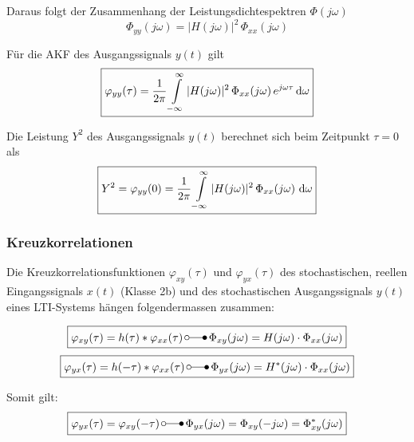 Daraus folgt der Zusammenhang der Leistungsdichtespektren $\Phi(j \omega)$
$$ \boxed{ \Phi_{yy}(j \omega) = |H(j \omega)|^2 \, \Phi_{xx}(j \omega) } $$

Für die AKF des Ausgangssignals $y(t)$ gilt 
$$ \boxed{ \varphi_{yy}(\tau) = \frac{1}{2 \pi} \int\limits_{- \infty}^{\infty} |H(j \omega)|^2 \, \Phi_{xx}(j \omega) \, e^{j \omega \tau} \mathop{} \! \mathrm{d} \omega } $$

Die Leistung $Y^2$ des Ausgangssignals $y(t)$ berechnet sich beim Zeitpunkt $\tau = 0$ als
$$ \boxed{ Y^2 = \varphi_{yy}(0) = \frac{1}{2 \pi} \int\limits_{- \infty}^{\infty} |H(j \omega)|^2 \, \Phi_{xx}(j \omega) \, \mathop{} \! \mathrm{d} \omega } $$


\subsubsection{Kreuzkorrelationen}
Die Kreuzkorrelationsfunktionen $\varphi_{xy}(\tau)$ und $\varphi_{yx}(\tau)$ des stochastischen, reellen Eingangssignals $x(t)$ 
(Klasse 2b) und des stochastischen Ausgangssignals $y(t)$ eines LTI-Systems hängen folgendermassen zusammen:

$$ \boxed{ \varphi_{xy}(\tau) = h(\tau) * \varphi_{xx}(\tau) \, \laplace \, \Phi_{xy}(j \omega) = H(j \omega) \cdot \Phi_{xx}(j \omega) } $$
$$ \boxed{ \varphi_{yx}(\tau) = h(-\tau) * \varphi_{xx}(\tau) \, \laplace \, \Phi_{yx}(j \omega) = H^*(j \omega) \cdot \Phi_{xx}(j \omega) } $$

Somit gilt:
$$ \boxed{ \varphi_{yx}(\tau) = \varphi_{xy}(-\tau) \, \laplace \, \Phi_{yx}(j \omega) = \Phi_{xy}(-j \omega) = \Phi^*_{xy}(j \omega) } $$